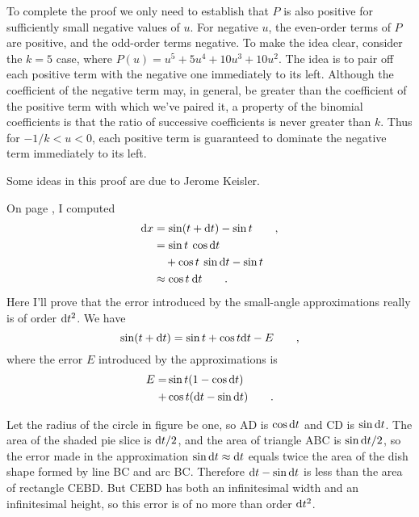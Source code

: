 To complete the proof we only need to establish that $P$ is also positive for sufficiently small
negative values of $u$.
For negative $u$, the even-order terms of $P$ are positive, and the odd-order
terms negative. To make the idea clear, consider the $k=5$ case,
where $P(u)=u^5+5u^4+10u^3+10u^2$. The idea is to pair off each positive
term with the negative one immediately to its left. Although the coefficient
of the negative term may, in general, be greater than the coefficient of
the positive term with which we've paired it, a property of the binomial coefficients
is that the ratio of successive coefficients is never greater than $k$. Thus for
$-1/k<u<0$, each positive term is guaranteed to dominate the negative term
immediately to its left.


Some ideas in this proof are due to Jerome Keisler.

On page \pageref{eg:derivative-of-sin}, I computed
\begin{align*}
  \textup{d} x &= \sin(t+\textup{d} t)-\sin t \qquad , \\
         &= \sin t \: \cos \textup{d} t \\
         &\quad + \cos t \: \sin \textup{d} t - \sin t \\
         &\approx \cos t \: \textup{d} t \qquad .
\end{align*}
Here I'll prove that the error introduced by the small-angle approximations really
is of order $\textup{d} t^2$. We have
\begin{equation*}
  \sin(t+\textup{d} t) = \sin t + \cos t \textup{d} t - E \qquad ,
\end{equation*}
where the error $E$ introduced by the approximations is
\begin{align*}
  E = &\sin t (1-\cos \textup{d} t) \\
    + &\cos t (\textup{d} t - \sin \textup{d} t) \qquad .
\end{align*}


Let the radius of the circle in figure  be one, so AD
is $\cos \textup{d} t$ and CD is $\sin \textup{d} t$. The area of the shaded pie slice
is $\textup{d} t/2$, and the area of triangle ABC is $\sin\textup{d} t/2$, so the
error made in the approximation $\sin\textup{d} t\approx\textup{d} t$ equals twice
the area of the dish shape formed by line BC and arc BC. Therefore
$\textup{d} t-\sin\textup{d} t$ is less than the area of rectangle CEBD.
But CEBD has both an infinitesimal width and an infinitesimal height,
so this error is of no more than order $\textup{d} t^2$.

